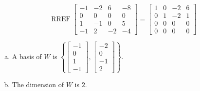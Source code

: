 \begin{exerciseAnswer} 


\[\operatorname{RREF} \left[\begin{array}{cccc}
-1 & -2 & 6 & -8 \\
0 & 0 & 0 & 0 \\
1 & -1 & 0 & 5 \\
-1 & 2 & -2 & -4
\end{array}\right] = \left[\begin{array}{cccc}
1 & 0 & -2 & 6 \\
0 & 1 & -2 & 1 \\
0 & 0 & 0 & 0 \\
0 & 0 & 0 & 0
\end{array}\right] \]


\begin{enumerate}[(a)]
\item A basis of \(W\) is \( \left\{ \left[\begin{array}{c}
-1 \\
0 \\
1 \\
-1
\end{array}\right] , \left[\begin{array}{c}
-2 \\
0 \\
-1 \\
2
\end{array}\right] \right\} \).
\item The dimension of \(W\) is \( 2 \).
\end{enumerate}
    
\end{exerciseAnswer}
    
